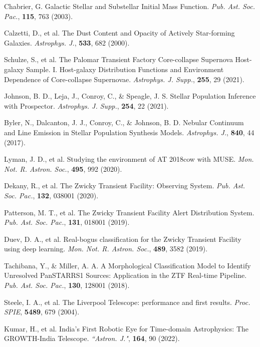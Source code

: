 \documentclass{nature_plusfigure}
\newcommand{\mn}{{Mon. Not. R. Astron. Soc.}}
\newcommand{\mnras}{\mn}
\newcommand{\aj}{{``Astron. J."}}
\newcommand{\apj}{{Astrophys. J.}}
\newcommand{\apjs}{{Astrophys. J. Supp.}}
\newcommand{\pasp}{{Pub. Ast. Soc. Pac.}}
\newcommand{\procspie}{Proc. SPIE}
\begin{document}
\begin{methods}
\begin{thebibliography}{10}
   Chabrier, G. Galactic Stellar and Substellar Initial Mass Function. \emph{\pasp}, \textbf{115}, 763 (2003). 

 Calzetti, D., et al. The Dust Content and Opacity of Actively Star-forming Galaxies. \emph{\apj}, \textbf{533}, 682 (2000). 

 Schulze, S., et al. The Palomar Transient Factory Core-collapse Supernova Host-galaxy Sample. I. Host-galaxy Distribution Functions and Environment Dependence of Core-collapse Supernovae. \emph{\apjs}, \textbf{255}, 29 (2021). 

  Johnson, B. D., Leja, J., Conroy, C., \& Speagle, J. S. Stellar Population Inference with Prospector. \emph{\apjs}, \textbf{254}, 22 (2021). 
 
  Byler, N., Dalcanton, J. J., Conroy, C., \& Johnson, B. D. Nebular Continuum and Line Emission in Stellar Population Synthesis Models. \emph{\apj}, \textbf{840}, 44 (2017). 
 
 
  Lyman, J. D., et al. Studying the environment of AT 2018cow with MUSE. \emph{\mnras}, \textbf{495}, 992 (2020). 



 Dekany, R., et al. The Zwicky Transient Facility: Observing System. \emph{\pasp}, \textbf{132}, 038001 (2020). 

 Patterson, M. T., et al. The Zwicky Transient Facility Alert Distribution System. \emph{\pasp}, \textbf{131}, 018001 (2019). 

  Duev, D. A., et al. Real-bogus classification for the Zwicky Transient Facility using deep learning. \emph{\mnras}, \textbf{489}, 3582 (2019). 

 Tachibana, Y., \& Miller, A. A. A Morphological Classification Model to Identify Unresolved PanSTARRS1 Sources: Application in the ZTF Real-time Pipeline. \emph{\pasp}, \textbf{130}, 128001 (2018). 

 Steele, I. A., et al. The Liverpool Telescope: performance and first results. \emph{\procspie}, \textbf{5489}, 679 (2004). 

 Kumar, H., et al. India's First Robotic Eye for Time-domain Astrophysics: The GROWTH-India Telescope. \emph{\aj}, \textbf{164}, 90 (2022). 


\end{thebibliography}
\end{methods}
\end{document}

